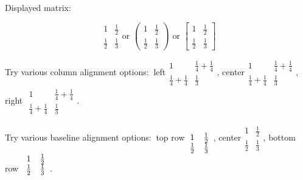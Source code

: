 \documentclass{article}
\begin{document}
Displayed matrix:

\begin{equation*}
\begin{array}{cc}
1 & \frac{1}{2} \\ 
\frac{1}{2} & \frac{1}{3}%
\end{array}%
\text{or }\left( 
\begin{array}{cc}
1 & \frac{1}{2} \\ 
\frac{1}{2} & \frac{1}{3}%
\end{array}%
\right) \text{ or }\left[ 
\begin{array}{cc}
1 & \frac{1}{2} \\ 
\frac{1}{2} & \frac{1}{3}%
\end{array}%
\right]
\end{equation*}

Try various column alignment options: $\ $left$%
\begin{array}{ll}
1 & \frac{1}{4}+\frac{1}{4} \\ 
\frac{1}{4}+\frac{1}{4} & \frac{1}{3}%
\end{array}%
$, center$%
\begin{array}{cc}
1 & \frac{1}{4}+\frac{1}{4} \\ 
\frac{1}{4}+\frac{1}{4} & \frac{1}{3}%
\end{array}%
$, right $%
\begin{array}{rr}
1 & \frac{1}{4}+\frac{1}{4} \\ 
\frac{1}{4}+\frac{1}{4} & \frac{1}{3}%
\end{array}%
$.

Try various baseline alignment options: $\ $top row$%
\begin{array}[t]{cc}
1 & \frac{1}{2} \\ 
\frac{1}{2} & \frac{1}{3}%
\end{array}%
$, center$%
\begin{array}{cc}
1 & \frac{1}{2} \\ 
\frac{1}{2} & \frac{1}{3}%
\end{array}%
$, bottom row $%
\begin{array}[b]{cc}
1 & \frac{1}{2} \\ 
\frac{1}{2} & \frac{1}{3}%
\end{array}%
$.
\end{document}
